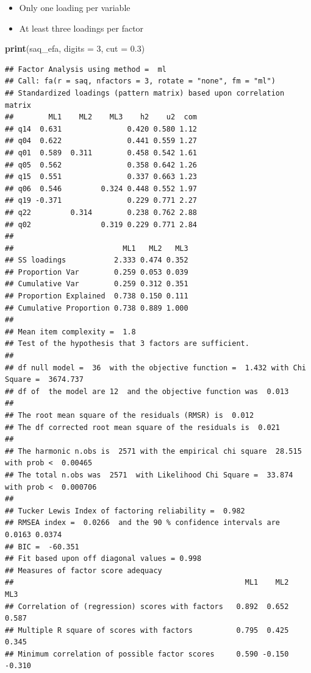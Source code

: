 \documentclass[
]{book}
\newenvironment{Shaded}{\begin{snugshade}}{\end{snugshade}}
\newcommand{\AttributeTok}[1]{\textcolor[rgb]{0.13,0.29,0.53}{#1}}
\newcommand{\DecValTok}[1]{\textcolor[rgb]{0.00,0.00,0.81}{#1}}
\newcommand{\FloatTok}[1]{\textcolor[rgb]{0.00,0.00,0.81}{#1}}
\newcommand{\FunctionTok}[1]{\textcolor[rgb]{0.13,0.29,0.53}{\textbf{#1}}}
\newcommand{\NormalTok}[1]{#1}
\providecommand{\tightlist}{%
  \setlength{\itemsep}{0pt}\setlength{\parskip}{0pt}}
\begin{document}
\begin{itemize}
\tightlist
\item
  Only one loading per variable
\item
  At least three loadings per factor
\end{itemize}

\begin{Shaded}
\begin{Highlighting}[]
\FunctionTok{print}\NormalTok{(saq\_efa, }\AttributeTok{digits =} \DecValTok{3}\NormalTok{, }\AttributeTok{cut =} \FloatTok{0.3}\NormalTok{)}
\end{Highlighting}
\end{Shaded}

\begin{verbatim}
## Factor Analysis using method =  ml
## Call: fa(r = saq, nfactors = 3, rotate = "none", fm = "ml")
## Standardized loadings (pattern matrix) based upon correlation matrix
##        ML1    ML2    ML3    h2    u2  com
## q14  0.631               0.420 0.580 1.12
## q04  0.622               0.441 0.559 1.27
## q01  0.589  0.311        0.458 0.542 1.61
## q05  0.562               0.358 0.642 1.26
## q15  0.551               0.337 0.663 1.23
## q06  0.546         0.324 0.448 0.552 1.97
## q19 -0.371               0.229 0.771 2.27
## q22         0.314        0.238 0.762 2.88
## q02                0.319 0.229 0.771 2.84
## 
##                         ML1   ML2   ML3
## SS loadings           2.333 0.474 0.352
## Proportion Var        0.259 0.053 0.039
## Cumulative Var        0.259 0.312 0.351
## Proportion Explained  0.738 0.150 0.111
## Cumulative Proportion 0.738 0.889 1.000
## 
## Mean item complexity =  1.8
## Test of the hypothesis that 3 factors are sufficient.
## 
## df null model =  36  with the objective function =  1.432 with Chi Square =  3674.737
## df of  the model are 12  and the objective function was  0.013 
## 
## The root mean square of the residuals (RMSR) is  0.012 
## The df corrected root mean square of the residuals is  0.021 
## 
## The harmonic n.obs is  2571 with the empirical chi square  28.515  with prob <  0.00465 
## The total n.obs was  2571  with Likelihood Chi Square =  33.874  with prob <  0.000706 
## 
## Tucker Lewis Index of factoring reliability =  0.982
## RMSEA index =  0.0266  and the 90 % confidence intervals are  0.0163 0.0374
## BIC =  -60.351
## Fit based upon off diagonal values = 0.998
## Measures of factor score adequacy             
##                                                     ML1    ML2    ML3
## Correlation of (regression) scores with factors   0.892  0.652  0.587
## Multiple R square of scores with factors          0.795  0.425  0.345
## Minimum correlation of possible factor scores     0.590 -0.150 -0.310
\end{verbatim}
\end{document}
